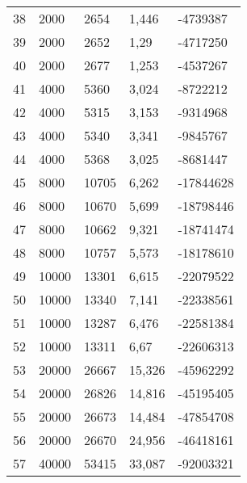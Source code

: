 \begin{longtable}{lllll}
    38               & 2000           & 2654           & 1,446       & -4739387        \\
    39               & 2000           & 2652           & 1,29        & -4717250        \\
    40               & 2000           & 2677           & 1,253       & -4537267        \\
    41               & 4000           & 5360           & 3,024       & -8722212        \\
    42               & 4000           & 5315           & 3,153       & -9314968        \\
    43               & 4000           & 5340           & 3,341       & -9845767        \\
    44               & 4000           & 5368           & 3,025       & -8681447        \\
    45               & 8000           & 10705          & 6,262       & -17844628       \\
    46               & 8000           & 10670          & 5,699       & -18798446       \\
    47               & 8000           & 10662          & 9,321       & -18741474       \\
    48               & 8000           & 10757          & 5,573       & -18178610       \\
    49               & 10000          & 13301          & 6,615       & -22079522       \\
    50               & 10000          & 13340          & 7,141       & -22338561       \\
    51               & 10000          & 13287          & 6,476       & -22581384       \\
    52               & 10000          & 13311          & 6,67        & -22606313       \\
    53               & 20000          & 26667          & 15,326      & -45962292       \\
    54               & 20000          & 26826          & 14,816      & -45195405       \\
    55               & 20000          & 26673          & 14,484      & -47854708       \\
    56               & 20000          & 26670          & 24,956      & -46418161       \\
    57               & 40000          & 53415          & 33,087      & -92003321       \\

\end{longtable}

